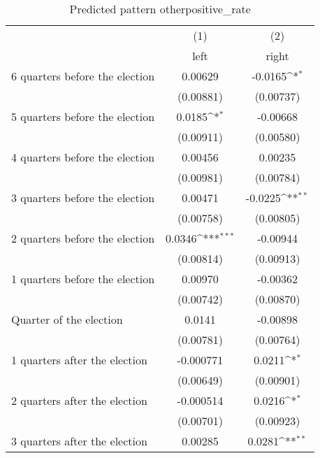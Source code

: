 \begin{table}[htbp]\centering
\def\sym#1{\ifmmode^{#1}\else\(^{#1}\)\fi}
\caption{Predicted pattern otherpositive\_rate}
\begin{tabular}{l*{2}{c}}
\hline\hline
                    &\multicolumn{1}{c}{(1)}&\multicolumn{1}{c}{(2)}\\
                    &\multicolumn{1}{c}{left}&\multicolumn{1}{c}{right}\\
\hline
 6 quarters before the election&     0.00629         &     -0.0165\sym{*}  \\
                    &   (0.00881)         &   (0.00737)         \\
[1em]
 5 quarters before the election&      0.0185\sym{*}  &    -0.00668         \\
                    &   (0.00911)         &   (0.00580)         \\
[1em]
 4 quarters before the election&     0.00456         &     0.00235         \\
                    &   (0.00981)         &   (0.00784)         \\
[1em]
 3 quarters before the election&     0.00471         &     -0.0225\sym{**} \\
                    &   (0.00758)         &   (0.00805)         \\
[1em]
 2 quarters before the election&      0.0346\sym{***}&    -0.00944         \\
                    &   (0.00814)         &   (0.00913)         \\
[1em]
 1 quarters before the election&     0.00970         &    -0.00362         \\
                    &   (0.00742)         &   (0.00870)         \\
[1em]
Quarter of the election&      0.0141         &    -0.00898         \\
                    &   (0.00781)         &   (0.00764)         \\
[1em]
 1 quarters after the election&   -0.000771         &      0.0211\sym{*}  \\
                    &   (0.00649)         &   (0.00901)         \\
[1em]
 2 quarters after the election&   -0.000514         &      0.0216\sym{*}  \\
                    &   (0.00701)         &   (0.00923)         \\
[1em]
 3 quarters after the election&     0.00285         &      0.0281\sym{**} \\

\end{tabular}
\end{table}

